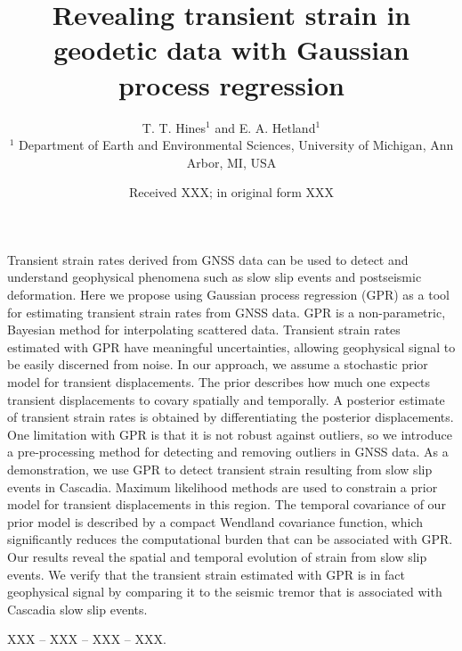 \documentclass[extra,mreferee]{gji}
\title[Transient strain in geodetic data]
      {Revealing transient strain in geodetic data with Gaussian process regression}
\author[T. T. Hines and E. A. Hetland]
       {T. T. Hines$^1$ and E. A. Hetland$^1$ \\
        $^1$ Department of Earth and Environmental Sciences, University of Michigan, Ann Arbor, MI, USA}
\date{Received XXX; in original form XXX}
\begin{document}
\label{firstpage}

\maketitle

\begin{summary}
Transient strain rates derived from GNSS data can be used to detect and understand geophysical phenomena such as slow slip events and postseismic deformation. Here we propose using Gaussian process regression (GPR) as a tool for estimating transient strain rates from GNSS data. GPR is a non-parametric, Bayesian method for interpolating scattered data. Transient strain rates estimated with GPR have meaningful uncertainties, allowing geophysical signal to be easily discerned from noise. In our approach, we assume a stochastic prior model for transient displacements. The prior describes how much one expects transient displacements to covary spatially and temporally. A posterior estimate of transient strain rates is obtained by differentiating the posterior displacements. One limitation with GPR is that it is not robust against outliers, so we introduce a pre-processing method for detecting and removing outliers in GNSS data. As a demonstration, we use GPR to detect transient strain resulting from slow slip events in Cascadia. Maximum likelihood methods are used to constrain a prior model for transient displacements in this region. The temporal covariance of our prior model is described by a compact Wendland covariance function, which significantly reduces the computational burden that can be associated with GPR. Our results reveal the spatial and temporal evolution of strain from slow slip events. We verify that the transient strain estimated with GPR is in fact geophysical signal by comparing it to the seismic tremor that is associated with Cascadia slow slip events.
\end{summary}

\begin{keywords}
 XXX -- XXX -- XXX -- XXX.
\end{keywords}
\end{document}
